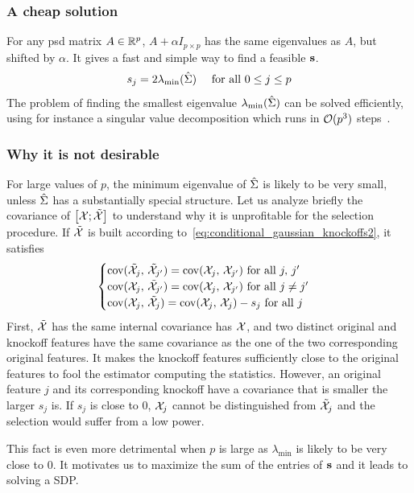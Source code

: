 \subsubsection{A cheap solution}

For any psd matrix $A \in \mathbb{R}^p$, $A + \alpha I_{p \times p}$ has the same eigenvalues as $A$, but shifted by $\alpha$.
It gives a fast and simple way to find a feasible $\mathbf{s}$.
\begin{equation}\label{eq:equi}
    s_j = 2\lambda_{\min}(\hat{\Sigma})
    \quad\text{ for all } 0 \leq j \leq p
\end{equation}
The problem of finding the smallest eigenvalue $\lambda_{\min}(\hat{\Sigma})$ can be solved efficiently,
using for instance a singular value decomposition which runs in $\mathcal{O}(p^3)$ steps~\cite{svd}.

\subsubsection{Why it is not desirable}

For large values of $p$,
the minimum eigenvalue of $\hat{\Sigma}$ is likely to be very small,
unless $\hat{\Sigma}$ has a substantially special structure.
Let us analyze briefly the covariance of $\big[ \mathcal{X}; \tilde{\mathcal{X}} \big]$
to understand why it is unprofitable for the selection procedure.
If $\tilde{\mathcal{X}}$ is built according to~\ref{eq:conditional_gaussian_knockoffs2}, it satisfies
\begin{equation*}
    \begin{cases}
        \operatorname*{cov}(\tilde{\mathcal{X}}_j,\, \tilde{\mathcal{X}}_{j'}) = \operatorname*{cov}(\mathcal{X}_j,\, \mathcal{X}_{j'}) \text{ for all } j,\,j'\\
        \operatorname*{cov}(\mathcal{X}_j,\, \tilde{\mathcal{X}}_{j'}) = \operatorname*{cov}(\mathcal{X}_j,\, \mathcal{X}_{j'}) \text{ for all } j \neq j'\\
        \operatorname*{cov}(\mathcal{X}_j,\, \tilde{\mathcal{X}}_j) = \operatorname*{cov}(\mathcal{X}_j,\, \mathcal{X}_j) - s_j \text{ for all } j
    \end{cases}
\end{equation*}
First, $\tilde{\mathcal{X}}$ has the same internal covariance has $\mathcal{X}$,
and two distinct original and knockoff features have the same covariance
as the one of the two corresponding original features.
It makes the knockoff features sufficiently close to the original features
to fool the estimator computing the statistics.
However, an original feature $j$ and its corresponding knockoff have a covariance that is smaller the larger $s_j$ is.
If $s_j$ is close to $0$,
$\mathcal{X}_j$ cannot be distinguished from $\tilde{\mathcal{X}}_j$ and the selection would suffer from a low power.

This fact is even more detrimental when $p$ is large as $\lambda_{\min}$ is likely to be very close to $0$.
It motivates us to maximize the sum of the entries of $\mathbf{s}$ and it leads to solving a SDP\@.

